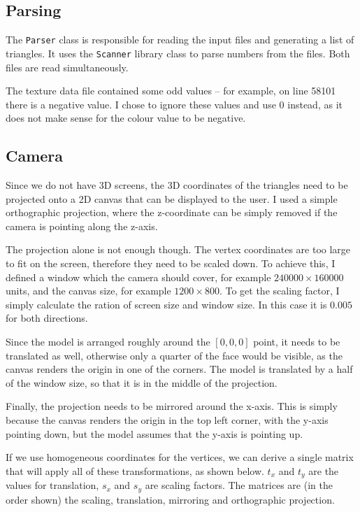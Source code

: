 \documentclass[]{article}
\begin{document}
\subsection{Parsing}

The \texttt{Parser} class is responsible for reading the input files and generating a list of triangles. It uses the \texttt{Scanner} library class to parse numbers from the files. Both files are read simultaneously.

The texture data file contained some odd values -- for example, on line 58101 there is a negative value. I chose to ignore these values and use 0 instead, as it does not make sense for the colour value to be negative.

\subsection{Camera}

Since we do not have 3D screens, the 3D coordinates of the triangles need to be projected onto a 2D canvas that can be displayed to the user. I used a simple orthographic projection, where the z-coordinate can be simply removed if the camera is pointing along the z-axis.

The projection alone is not enough though. The vertex coordinates are too large to fit on the screen, therefore they need to be scaled down. To achieve this, I defined a window which the camera should cover, for example $240000 \times 160000$ units, and the canvas size, for example $1200 \times 800$. To get the scaling factor, I simply calculate the ration of screen size and window size. In this case it is $0.005$ for both directions.

Since the model is arranged roughly around the $[0, 0, 0]$ point, it needs to be translated as well, otherwise only a quarter of the face would be visible, as the canvas renders the origin in one of the corners. The model is translated by a half of the window size, so that it is in the middle of the projection.

Finally, the projection needs to be mirrored around the x-axis. This is simply because the canvas renders the origin in the top left corner, with the y-axis pointing down, but the model assumes that the y-axis is pointing up.

If we use homogeneous coordinates for the vertices, we can derive a single matrix that will apply all of these transformations, as shown below. $t_x$ and $t_y$ are the values for translation, $s_x$ and $s_y$ are scaling factors. The matrices are (in the order shown) the scaling, translation, mirroring and orthographic projection.
\end{document}
